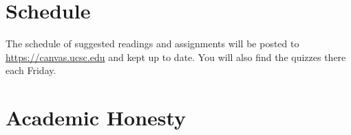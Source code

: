 \documentclass{article}
\newcommand{\red}[1]{\textcolor{red}{#1}}
\begin{document}
\section{Schedule}

The schedule of suggested readings and assignments will be posted to \url{https://canvas.ucsc.edu} and
kept up to date. You will also find the quizzes there each Friday. 


\section{Academic Honesty}
\end{document}
